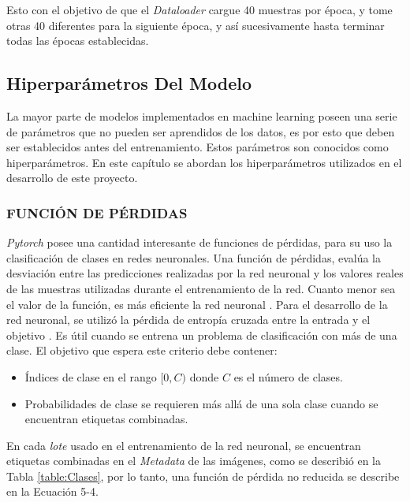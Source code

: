 		Esto con el objetivo de que el \textit{Dataloader} cargue 40 muestras por época, y tome otras 40 diferentes para la siguiente época, y así sucesivamente hasta terminar todas las épocas establecidas.  
		
		
		
			
		
		\subsection{Hiperparámetros Del Modelo}
		
		La mayor parte de modelos implementados en machine learning poseen una serie de parámetros que no pueden ser aprendidos de los datos, es por esto que deben ser establecidos antes del entrenamiento. Estos parámetros son conocidos como hiperparámetros. En este capítulo se abordan los hiperparámetros utilizados en el desarrollo de este proyecto.
		
			\subsubsection{FUNCIÓN DE PÉRDIDAS}		
			
			\textit{Pytorch} posee una cantidad interesante de funciones de pérdidas, para su uso la clasificación de clases en redes neuronales. Una función de pérdidas, evalúa la desviación entre las predicciones realizadas por la red neuronal y los valores reales de las muestras utilizadas durante el entrenamiento de la red. Cuanto menor sea el valor de la función, es más eficiente la red neuronal \cite{mathivet2018inteligencia}. 	
			Para el desarrollo de la red neuronal, se utilizó la pérdida de entropía cruzada entre la entrada y el objetivo \cite{Pytorch}. Es útil cuando se entrena un problema de clasificación con más de una clase.  El objetivo que espera este criterio debe contener:
			
			\begin{itemize}
				\item Índices de clase en el rango $[0,C)$ donde $C$ es el número de clases.
				\item Probabilidades de clase se requieren más allá de una sola clase cuando se encuentran etiquetas combinadas.				 
			\end{itemize}
			
			En cada \textit{lote} usado en el entrenamiento de la red neuronal, se encuentran etiquetas combinadas en el \textit{Metadata} de las imágenes, como se describió en la Tabla \ref{table:Clases}, por lo tanto, una función de pérdida no reducida \cite{Pytorch} se describe en la Ecuación 5-4.\\
			

